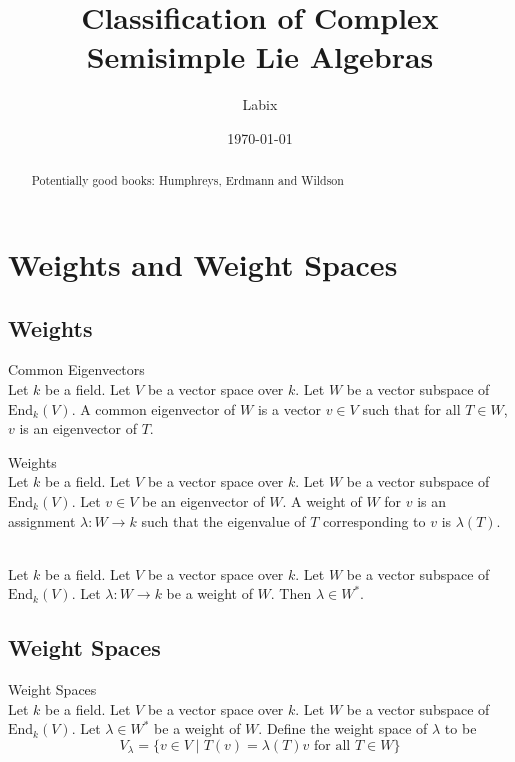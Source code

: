 \documentclass[a4paper]{article}
\title{Classification of Complex Semisimple Lie Algebras}
\author{Labix}
\date{\today}
\begin{document}
\maketitle
\begin{abstract}
Potentially good books: Humphreys, Erdmann and Wildson
\end{abstract}
\pagebreak
\tableofcontents

\pagebreak
\section{Weights and Weight Spaces}
\subsection{Weights}
\begin{defn}{Common Eigenvectors}{} \\Let $k$ be a field. Let $V$ be a vector space over $k$. Let $W$ be a vector subspace of $\text{End}_k(V)$. A common eigenvector of $W$ is a vector $v\in V$ such that for all $T\in W$, $v$ is an eigenvector of $T$. 
\end{defn}

\begin{defn}{Weights}{} \\Let $k$ be a field. Let $V$ be a vector space over $k$. Let $W$ be a vector subspace of $\text{End}_k(V)$. Let $v\in V$ be an eigenvector of $W$. A weight of $W$ for $v$ is an assignment $\lambda:W\to k$ such that the eigenvalue of $T$ corresponding to $v$ is $\lambda(T)$. 
\end{defn}

\begin{lmm}{}{} \\Let $k$ be a field. Let $V$ be a vector space over $k$. Let $W$ be a vector subspace of $\text{End}_k(V)$. Let $\lambda:W\to k$ be a weight of $W$. Then $\lambda\in W^\ast$. 
\end{lmm}

\subsection{Weight Spaces}
\begin{defn}{Weight Spaces}{} \\Let $k$ be a field. Let $V$ be a vector space over $k$. Let $W$ be a vector subspace of $\text{End}_k(V)$. Let $\lambda\in W^\ast$ be a weight of $W$. Define the weight space of $\lambda$ to be $$V_\lambda=\{v\in V\;|\;T(v)=\lambda(T)v\text{ for all }T\in W\}$$
\end{defn}
\end{document}
